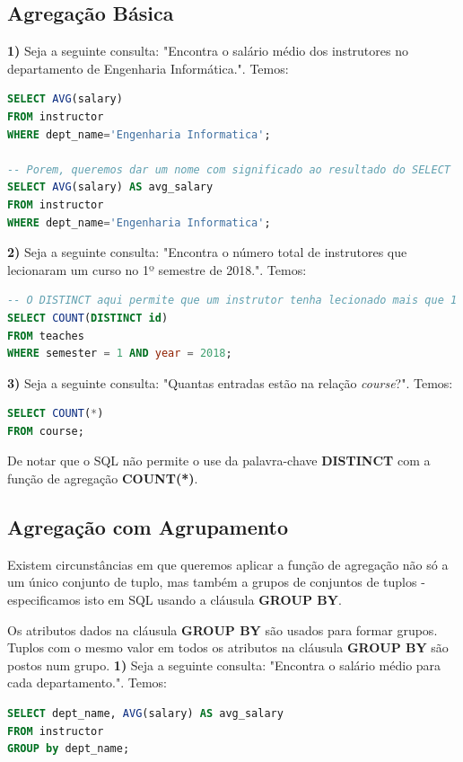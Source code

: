 \documentclass[oneside]{book}
\theoremstyle{definition}
\begin{document}
\subsection{Agregação Básica}
\textbf{1)} Seja a seguinte consulta: "Encontra o salário médio dos instrutores no departamento de Engenharia Informática.". Temos:
\begin{lstlisting}[language=SQL, morekeywords={REFERENCES, REFRESH, MATERIALIZED, CONCURRENTLY}, framesep=8pt, xleftmargin=40pt, framexleftmargin=40pt, frame=tb, framerule=0pt]
SELECT AVG(salary)
FROM instructor
WHERE dept_name='Engenharia Informatica';

-- Porem, queremos dar um nome com significado ao resultado do SELECT
SELECT AVG(salary) AS avg_salary
FROM instructor
WHERE dept_name='Engenharia Informatica';
\end{lstlisting}

\textbf{2)} Seja a seguinte consulta: "Encontra o número total de instrutores que lecionaram um curso no 1º semestre de 2018.". Temos:
\begin{lstlisting}[language=SQL, morekeywords={REFERENCES, REFRESH, MATERIALIZED, CONCURRENTLY}, framesep=8pt, xleftmargin=40pt, framexleftmargin=40pt, frame=tb, framerule=0pt]
-- O DISTINCT aqui permite que um instrutor tenha lecionado mais que 1 curso, mas ser contado apenas 1 vez
SELECT COUNT(DISTINCT id)
FROM teaches
WHERE semester = 1 AND year = 2018;
\end{lstlisting}

\textbf{3)} Seja a seguinte consulta: "Quantas entradas estão na relação \textit{course}?". Temos:
\begin{lstlisting}[language=SQL, morekeywords={REFERENCES, REFRESH, MATERIALIZED, CONCURRENTLY}, framesep=8pt, xleftmargin=40pt, framexleftmargin=40pt, frame=tb, framerule=0pt]
SELECT COUNT(*)
FROM course;
\end{lstlisting}
De notar que o SQL não permite o use da palavra-chave \textbf{DISTINCT} com a função de agregação \textbf{COUNT(*)}.

\subsection{Agregação com Agrupamento}
Existem circunstâncias em que queremos aplicar a função de agregação não só a um único conjunto de tuplo, mas também a grupos de conjuntos de tuplos - especificamos isto em SQL usando a cláusula \textbf{GROUP BY}. 

Os atributos dados na cláusula \textbf{GROUP BY} são usados para formar grupos. Tuplos com o mesmo valor em todos os atributos na cláusula \textbf{GROUP BY} são postos num grupo.
\textbf{1)} Seja a seguinte consulta: "Encontra o salário médio para cada departamento.". Temos:
\begin{lstlisting}[language=SQL, morekeywords={REFERENCES, REFRESH, MATERIALIZED, CONCURRENTLY}, framesep=8pt, xleftmargin=40pt, framexleftmargin=40pt, frame=tb, framerule=0pt]
SELECT dept_name, AVG(salary) AS avg_salary
FROM instructor
GROUP by dept_name;
\end{lstlisting}
\end{document}
